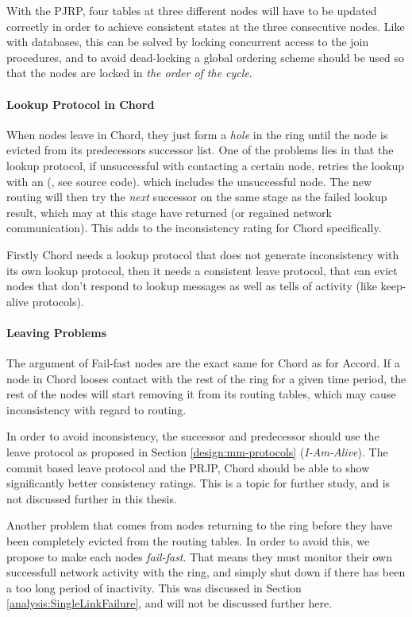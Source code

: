 With the PJRP, four tables at three different nodes will have to be updated
 correctly in order to achieve consistent states at the three consecutive nodes.
 Like with databases, this can be solved by locking concurrent access to the join
 procedures, and to avoid dead-locking a global ordering scheme should be used
 so that the nodes are locked in \emph{the order of the cycle}.

\paragraph{Lookup Protocol in Chord}

When nodes leave in Chord, they just form a \emph{hole} in the ring until the node
 is evicted from its predecessors successor list. One of the problems lies in that
 the lookup protocol, if unsuccessful with contacting a certain node, retries the
 lookup with an  (\cite{chord-homepage}, see source code). which
 includes the unsuccessful node. The new routing will then try the \emph{next}
 successor on the same stage as the failed lookup result, which may at this stage
 have returned (or regained network communication). This adds to the inconsistency
 rating for Chord specifically.

Firstly Chord needs a lookup protocol that does not generate inconsistency with its
 own lookup protocol, then it needs a consistent leave protocol, that can evict nodes
 that don't respond to lookup messages as well as tells of activity (like keep-alive
 protocols).

\paragraph{Leaving Problems}

The argument of Fail-fast nodes are the exact same for Chord as for Accord. If a node
 in Chord looses contact with the rest of the ring for a given time period, the
 rest of the nodes will start removing it from its routing tables, which may cause
 inconsistency with regard to routing.
 
In order to avoid inconsistency, the successor and predecessor should use the leave
 protocol as proposed in Section \ref{design:mm-protocols} (\emph{I-Am-Alive}).
 The commit based leave protocol and the PRJP, Chord should be able to show significantly
 better consistency ratings. This is a topic for further study, and is not discussed
 further in this thesis.

Another problem that comes from nodes returning to the ring before they have been
 completely evicted from the routing tables. In order to avoid this, we propose
 to make each nodes \emph{fail-fast}. That means they must monitor their own
 successfull network activity with
 the ring, and simply shut down if there has been a too long period of inactivity.
 This was discussed in Section \ref{analysis:SingleLinkFailure}, and will not be
 discussed further here.


